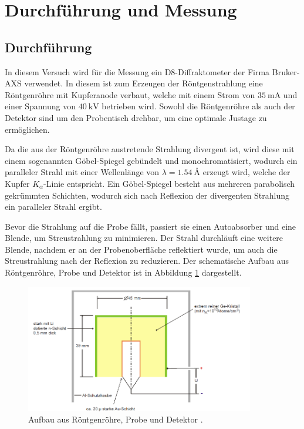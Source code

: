 \section{Durchführung und Messung}
\subsection{Durchführung}
In diesem Versuch wird für die Messung ein D8-Diffraktometer der Firma Bruker-AXS verwendet. In diesem
ist zum Erzeugen der Röntgenstrahlung eine Röntgenröhre mit Kupferanode verbaut,
welche mit einem Strom von $\SI{35}{\mA}$ und einer Spannung von $\SI{40}{\kV}$ betrieben wird.
Sowohl die Röntgenröhre als auch der Detektor sind um den Probentisch drehbar, um eine optimale Justage zu ermöglichen.

Da die aus der Röntgenröhre austretende Strahlung divergent ist, wird diese mit einem sogenannten Göbel-Spiegel
gebündelt und monochromatisiert, wodurch ein paralleler Strahl mit einer Wellenlänge von $\lambda=\SI{1,54}{\angstrom}$
erzeugt wird, welche der Kupfer $K_{\alpha}$-Linie entspricht. Ein Göbel-Spiegel besteht aus mehreren parabolisch gekrümmten Schichten,
wodurch sich nach Reflexion der divergenten Strahlung ein paralleler Strahl ergibt.

Bevor die Strahlung auf die Probe fällt, passiert sie einen Autoabsorber und eine Blende, um Streustrahlung zu minimieren.
Der Strahl durchläuft eine weitere Blende, nachdem er an der Probenoberfläche reflektiert wurde, um auch die Streustrahlung
nach der Reflexion zu reduzieren. Der schematische Aufbau aus Röntgenröhre, Probe und Detektor ist in Abbildung
\ref{fig:aufbau} dargestellt.

\begin{figure}
  \centering
  \includegraphics[width=10cm]{aufbau.png}
  \caption{Aufbau aus Röntgenröhre, Probe und Detektor \cite{aufbau}.}
  \label{fig:aufbau}
\end{figure}

